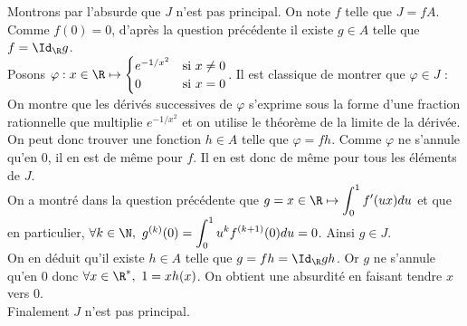 \documentclass[8pt]{book}
\begin{document}
\begin{enumerate}[leftmargin=*]
\begin{enumerate}[label=\alph*.]
			Montrons par l'absurde que $J$ n'est pas principal. On note $f$ telle que $J=fA$.\\
			Comme $f(0)=0$, d'après la question précédente il existe $g\in A$ telle que $f=\Id_\R g$.\\
			Posons $\varphi:x\in \R\mapsto\begin{cases}
				e^{-1/x^2}&\mbox{si }x\ne 0\\
				0&\mbox{si }x=0
			\end{cases}$. Il est classique de montrer que $\varphi\in J$ : On montre que les dérivés successives de $\varphi$ s'exprime sous la forme d'une fraction rationnelle que multiplie $e^{-1/x^2}$ et on utilise le théorème de la limite de la dérivée.\\
			On peut donc trouver une fonction $h\in A$ telle que $\varphi=fh$. Comme $\varphi$ ne s'annule qu'en $0$, il en est de même pour $f$. Il en est donc de même pour tous les éléments de $J$.\\
			On a montré dans la question précédente que $g=x\in \R\mapsto \displaystyle\int_0^1f'(ux)du$ et que en particulier, $\forall k\in \N,\ g^{(k)}(0)=\displaystyle\int_0^1u^kf^{(k+1)}(0)du=0$. Ainsi $g\in J$.\\
			On en déduit qu'il existe $h\in A$ telle que $g=fh=\Id_\R gh$. Or $g$ ne s'annule qu'en $0$ donc $\forall x\in \R^*,\ 1=xh(x)$. On obtient une absurdité en faisant tendre $x$ vers $0$.\\
			Finalement $J$ n'est pas principal.
		\end{enumerate}
	\end{enumerate}
	
\end{document}
